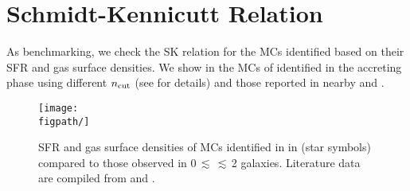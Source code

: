 \IfFileExists{emulateapjlegacy.cls}{\documentclass[iop]{emulateapjlegacy}}{\documentclass[iop]{emulateapj}}
\begin{document}





\appendix
\section{Schmidt-Kennicutt Relation}
As benchmarking, we check the SK relation for the MCs identified based on their SFR and gas surface densities.
We show in  the MCs of \flower identified in the accreting phase using different $n_{\rm cut}$
(see  for details) and those reported in nearby and \highz \obs \citep{Kennicutt98a, Bouche07a, Daddi10a, Daddi10b, Genzel10a, Tacconi10a}. 


\begin{figure*}[htbp]
\centering
\texttt{[image: \\figpath/]}
\caption{
SFR and gas surface densities of MCs identified in \flower in  (star symbols) compared to those 
observed in 0\,$\lesssim$\,\z$\lesssim$\,2 galaxies.
Literature data are compiled from \citealt{Kennicutt98a, Bouche07a, Daddi10a, Daddi10b, Genzel10a, Tacconi10a} and 
\citealt{Pallottini17b}.
\label{fig:sk}}
\end{figure*}




%

%
\end{document}

